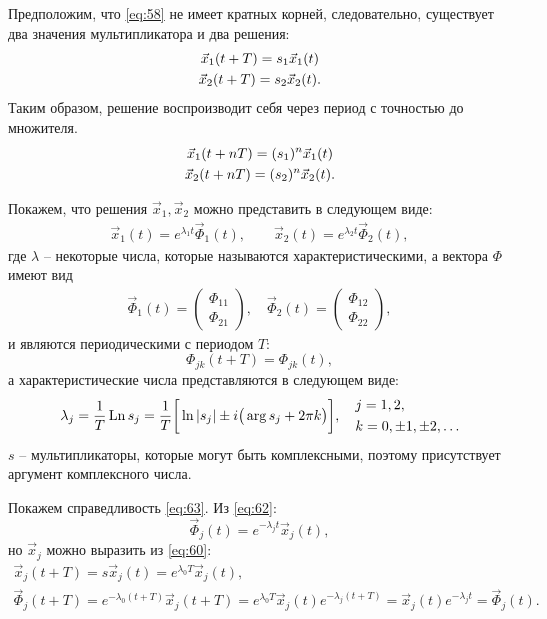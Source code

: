 Предположим, что \eqref{eq:58} не имеет кратных корней, следовательно, существует два значения мультипликатора и два решения:
\begin{gather}
	\vec{x}_1(t+T)=s_1\vec{x}_1(t) \notag \\ 
	\vec{x}_2(t+T)=s_2\vec{x}_2(t).		
	\label{eq:60}
\end{gather}
Таким образом, решение воспроизводит себя через период с точностью до множителя. 
\begin{gather}
	\vec{x}_1(t+nT)=(s_1)^n\vec{x}_1(t) \notag \\ 
	\vec{x}_2(t+nT)=(s_2)^n\vec{x}_2(t).		
	\label{eq:61}
\end{gather}

Покажем, что решения $\vec{x}_1,\vec{x}_2$ можно представить в следующем виде:
\begin{gather}
	\vec{x}_1(t)=e^{\lambda_1t}\vec{\Phi}_1(t), \qquad
	\vec{x}_2(t)=e^{\lambda_2t}\vec{\Phi}_2(t),		
	\label{eq:62}
\end{gather}
где $\lambda$ -- некоторые числа, которые называются характеристическими, а вектора $\Phi$ имеют вид
\begin{gather*}
	\vec{\Phi}_1(t)= 
	\begin{pmatrix}
		\Phi_{11} \\
		\Phi_{21}
	\end{pmatrix}
	,\quad
	\vec{\Phi}_2(t)= 
	\begin{pmatrix}
		\Phi_{12} \\
		\Phi_{22}
	\end{pmatrix}
	,
\end{gather*}
и являются периодическими с периодом $T$:
\begin{equation}
	\Phi_{jk}(t+T)=\Phi_{jk}(t),
	\label{eq:63}
\end{equation}
а характеристические числа представляются в следующем виде:
\begin{gather}
	\lambda_j=\frac{1}{T}\,\mathrm{Ln}\,s_j=\frac1{T}\qty[\vphantom{\bigg|}\ln|s_j|\pm i\qty(\vphantom{\big|}\arg s_j +2\pi k)], \quad
	\begin{aligned}
		&j=1,2, \\
		&k=0,\pm 1, \pm 2, \ldots	
	\end{aligned}
	\label{eq:64}
\end{gather}
$s$ -- мультипликаторы, которые могут быть комплексными, поэтому присутствует аргумент комплексного числа.

Покажем справедливость \eqref{eq:63}. Из \eqref{eq:62}:
\begin{equation*}
	\vec{\Phi}_j(t)=e^{-\lambda_j t}\vec{x}_j(t),
\end{equation*}
но $\vec{x}_j$ можно выразить из \eqref{eq:60}:
\begin{gather*}
	\vec{x}_j(t+T)=s\vec{x}_j(t)=e^{\lambda_0 T}\vec{x}_j(t), \\
	\vec{\Phi}_j(t+T)=e^{-\lambda_0(t+T)}\vec{x}_j(t+T)=e^{\lambda_0 T}\vec{x}_j(t)e^{-\lambda_j(t+T)}=\vec{x}_j(t)e^{-\lambda_j t}=\vec{\Phi}_j(t).
\end{gather*}

